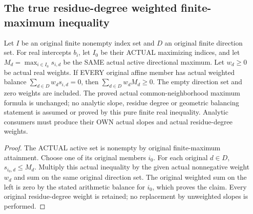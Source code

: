 \subsection{The true residue-degree weighted finite-maximum inequality}

\begin{theorem}
\label{analysis:actual-weighted-active-max-slope-sum}
\leanok
{}
Let $I$ be an original finite nonempty index set and $D$ an original
finite direction set. For real intercepts $b_i$, let $I_0$ be their
ACTUAL maximizing indices, and let $M_d=\max_{i\in I_0}s_{i,d}$ be the
SAME actual active directional maximum. Let $w_d\ge0$ be actual real
weights. If EVERY original affine member has actual weighted balance
$\sum_{d\in D}w_d s_{i,d}=0$, then
$\sum_{d\in D}w_d M_d\ge0$.
The empty direction set and zero weights are included. The proved actual common-neighborhood maximum formula is unchanged; no
analytic slope, residue degree or geometric balancing statement is assumed
or proved by this pure finite real inequality. Analytic consumers must
produce their OWN actual slopes and actual residue-degree weights.
\end{theorem}
\begin{proof}
The ACTUAL active set is nonempty by original finite-maximum attainment.
Choose one of its original members $i_0$. For each original $d\in D$,
$s_{i_0,d}\le M_d$. Multiply this actual inequality by the given actual
nonnegative weight $w_d$ and sum on the same original direction set.
The original weighted sum on the left is zero by the stated arithmetic
balance for $i_0$, which proves the claim. Every original residue-degree
weight is retained; no replacement by unweighted slopes is performed.
\end{proof}
